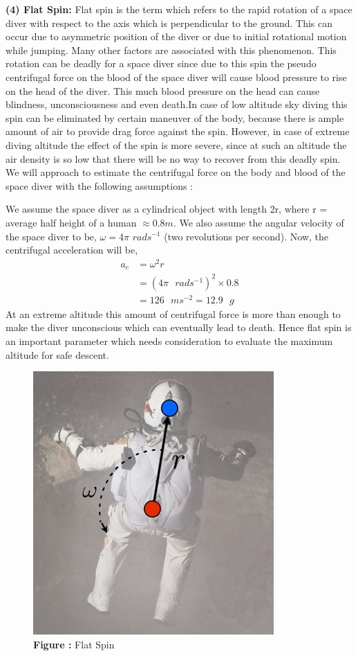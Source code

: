 \documentclass[a4paper, 14pt]{extarticle}
\begin{document}
\textbf{(4) Flat Spin:} Flat spin is the term which refers to the rapid rotation of a space diver with respect to the axis which is perpendicular to the ground. This can occur due to asymmetric position of the diver or due to initial rotational motion while jumping. Many other factors are associated with this phenomenon. This rotation can be deadly for a space diver since due to this spin the pseudo centrifugal force on the blood of the space diver will cause blood pressure to rise on the head of the diver. This much blood pressure on the head can cause blindness, unconsciousness and even death.In case of low altitude sky diving this spin can be eliminated by certain maneuver of the body, because there is ample amount of air to provide drag force against the spin. However, in case of extreme diving altitude the effect of the spin is more severe, since at such an altitude the air density is so low that there will be no way to recover from this deadly spin.\\
We will approach to estimate the centrifugal force on the body and blood of the space diver with the following assumptions :

We assume the space diver as a cylindrical object with length 2r, where r = average half height of a human $\approx0.8 m$. We also assume the angular velocity of the space diver to be, $\omega = 4\pi$ $rads^{-1}$ (two revolutions per second). Now, the centrifugal acceleration will be, 
\begin{align*}
    a_c &= \omega^2 r\\
        &= (4\pi \text{ }rads^{-1})^2 \times 0.8\\
        &= 126\text{ }ms^{-2}=12.9\text{ }g
\end{align*}
At an extreme altitude this amount of centrifugal force is more than enough to make the diver unconscious which can eventually lead to death. Hence flat spin is an important parameter which needs consideration to evaluate the maximum altitude for safe descent.
\begin{figure}[H]
\centering
\includegraphics[width=0.6\linewidth]{flat-spin.jpeg}
\caption*{\textbf{Figure : }Flat Spin}
\end{figure}
\end{document}

